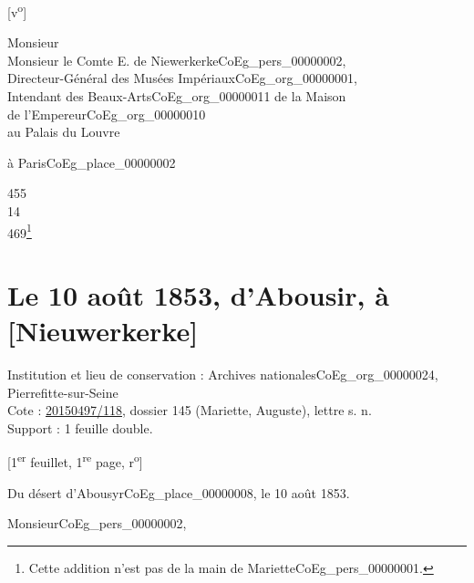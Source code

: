 \documentclass{book}
\begin{document}
{\footnotesize \begin{center} {[v\textsuperscript{o}]}\end{center}}
\noindent Monsieur\\
\indent Monsieur le Comte E. de Niewerkerke\gls{CoEg_pers_00000002},\\
\noindent Directeur-Général des Musées Impériaux\gls{CoEg_org_00000001},\\
\indent Intendant des Beaux-Arts\gls{CoEg_org_00000011} de la Maison\\
\indent \hspace{2cm} de l’Empereur\gls{CoEg_org_00000010}\\
\indent au Palais du Louvre
\begin{center} à Paris\gls{CoEg_place_00000002}\end{center}
\begin{flushright}455\\
14\\
469\footnote{Cette addition n'est pas de la main de Mariette\gls{CoEg_pers_00000001}.}\end{flushright}
\section*{Le 10 août 1853, d'Abousir, à [Nieuwerkerke]} \label{CoEg_Mariette_1853-08-10} 
{\footnotesize \noindent Institution et lieu de conservation : Archives nationales\gls{CoEg_org_00000024}, Pierrefitte-sur-Seine\\
Cote : \hyperref[CoEg_Mariette_ms_001]{20150497/118}, dossier 145 (Mariette, Auguste), lettre s. n.\\
Support : 1 feuille double.
\begin{center} {[1\textsuperscript{er} feuillet, 1\textsuperscript{re} page, r\textsuperscript{o}]}\end{center}}
\begin{flushright}Du désert d’Abousyr\gls{CoEg_place_00000008}, le 10 août 1853.\end{flushright}

\hspace{1cm} Monsieur\gls{CoEg_pers_00000002},\\
\end{document}
